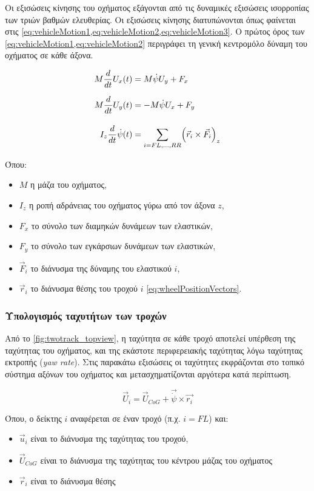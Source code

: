 Οι εξισώσεις κίνησης του οχήματος εξάγονται από τις δυναμικές εξισώσεις ισορροπίας των τριών βαθμών ελευθερίας. Οι εξισώσεις κίνησης διατυπώνονται όπως φαίνεται στις \cref{eq:vehicleMotion1,eq:vehicleMotion2,eq:vehicleMotion3}.
Ο πρώτος όρος των \cref{eq:vehicleMotion1,eq:vehicleMotion2} περιγράφει τη γενική κεντρομόλο δύναμη του οχήματος σε κάθε άξονα.

\begin{align}
    M\dfrac{d}{dt}U_x(t) &= M\dot{\psi} U_y + F_x\label{eq:vehicleMotion1}\\[6pt]
    M\dfrac{d}{dt}U_y(t) &= -M\dot{\psi} U_x + F_y\label{eq:vehicleMotion2}\\[10pt]
    I_z\dfrac{d}{dt}\dot{\psi}(t) &=\sum_{i=FL,\dots, RR} \Bigl(\vec{r}_i\times\vec{F}_i\Bigr)_z
  \label{eq:vehicleMotion3}
\end{align}

Όπου:
\begin{itemize}
  \item $M$ η μάζα του οχήματος,
  \item $I_z$ η ροπή αδράνειας του οχήματος γύρω από τον άξονα $z$,
  \item $F_x$ το σύνολο των διαμηκών δυνάμεων των ελαστικών,
  \item $F_y$ το σύνολο των εγκάρσιων δυνάμεων των ελαστικών,
  \item $\vec{F}_i$ το διάνυσμα της δύναμης του ελαστικού $i$,
  \item $\vec{r}_i$ το διάνυσμα θέσης του τροχού $i$ \cref{eq:wheelPositionVectors}.
\end{itemize}

\subsubsection{Υπολογισμός ταχυτήτων των τροχών}

Από το \cref{fig:twotrack_topview}, η ταχύτητα σε κάθε τροχό αποτελεί υπέρθεση της ταχύτητας του οχήματος,
και της εκάστοτε περιφερειακής ταχύτητας λόγω ταχύτητας εκτροπής (\textit{yaw rate}). Στις παρακάτω εξισώσεις οι ταχύτητες
εκφράζονται στο τοπικό σύστημα αξόνων του οχήματος και μετασχηματίζονται αργότερα κατά περίπτωση.

\begin{equation}
  \vec{U}_i = \vec{U}_{CoG} + \vec{\dot{\psi}}\times \vec{r_i}
  \label{eq:wheelVelocity}
\end{equation}

Όπου, ο δείκτης $i$ αναφέρεται σε έναν τροχό (π.χ. $i=FL$) και:
\begin{itemize}
\item $\vec{u}_i$ είναι το διάνυσμα της ταχύτητας του τροχού,
\item $\vec{U}_{CoG}$ είναι το διάνυσμα της ταχύτητας του κέντρου μάζας του οχήματος
\item $\vec{r}_i$ είναι το διάνυσμα θέσης 
\end{itemize}

